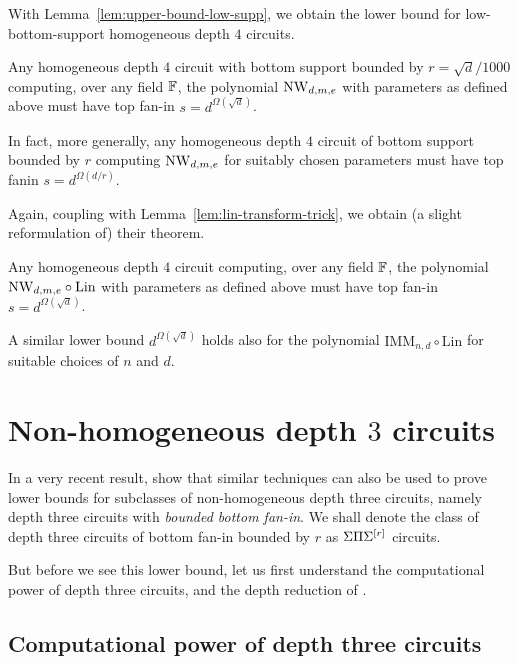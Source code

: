 With Lemma~\ref{lem:upper-bound-low-supp}, we obtain the lower bound for low-bottom-support homogeneous depth $4$ circuits. 

\begin{theorem}[\cite{KS14}]\label{thm:IMM-lowsup-lb}
Any homogeneous depth $4$ circuit with bottom support bounded by $r = \sqrt{d}/1000$ computing, over any field $\mathbb{F}$, the polynomial $\mathrm{NW}_{d,m,e}$ with parameters as defined above must have top fan-in $s = d^{\Omega(\sqrt{d})}$. 

In fact, more generally, any homogeneous depth $4$ circuit of bottom support bounded by $r$ computing $\mathrm{NW}_{d,m,e}$ for suitably chosen parameters must have top fanin $s = d^{\Omega(d/r)}$. 
\end{theorem}

Again, coupling with Lemma~\ref{lem:lin-transform-trick}, we obtain (a slight reformulation of) their theorem. 

\begin{theorem}\label{thm:IMM-lb}
Any homogeneous depth $4$ circuit computing, over any field $\mathbb{F}$,  the polynomial $\mathrm{NW}_{d,m,e}\circ \mathrm{Lin}$ with parameters as defined above must have top fan-in $s = d^{\Omega(\sqrt{d})}$. 

A similar lower bound $d^{\Omega(\sqrt{d})}$ holds also for the polynomial $\mathrm{IMM}_{n,d} \circ \mathrm{Lin}$ for suitable choices of $n$ and $d$. 
\end{theorem}

\section{Non-homogeneous depth $3$ circuits}\label{sec:kayalsaha}

In a very recent result, \cite{KayalSaha14} show that similar techniques can also be used to prove lower bounds for subclasses of non-homogeneous depth three circuits, namely depth three circuits with \emph{bounded bottom fan-in}. We shall denote the class of depth three circuits of bottom fan-in bounded by $r$ as $\Sigma\Pi\Sigma^{[r]}$ circuits. 

But before we see this lower bound, let us first understand the computational power of depth three circuits, and the depth reduction of \cite{gkks13b}. 

\subsection{Computational power of depth three circuits}

